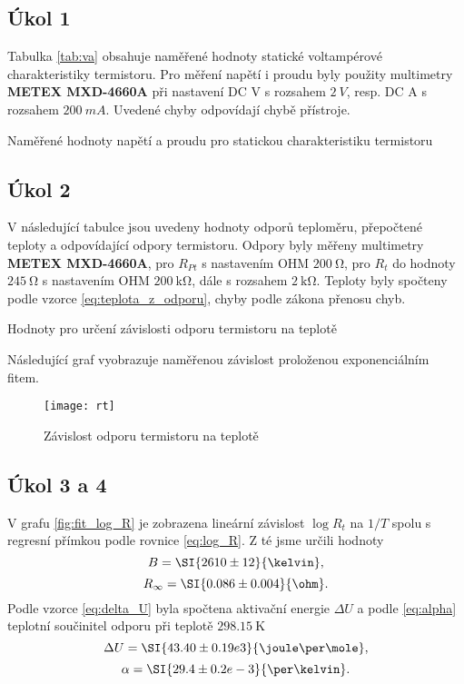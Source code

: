\documentclass[0-protokol.tex]{subfiles}
\begin{document}
\subsection*{Úkol 1}

Tabulka \ref{tab:va} obsahuje naměřené hodnoty statické voltampérové charakteristiky termistoru. Pro měření napětí i proudu byly použity multimetry \textbf{METEX MXD-4660A} při nastavení DC V s rozsahem $\SI{2}{V}$, resp. DC A s rozsahem $\SI{200}{mA}$. Uvedené chyby odpovídají chybě přístroje.%
\begin{table}[H] 
\centering
\setlength{\tabcolsep}{7pt}

\caption{Naměřené hodnoty napětí a proudu pro statickou charakteristiku termistoru}
\label{tab:va}
\end{table}

\subsection*{Úkol 2}
V následující tabulce jsou uvedeny hodnoty odporů teploměru, přepočtené teploty a odpovídající odpory termistoru. Odpory byly měřeny multimetry \textbf{METEX MXD-4660A}, pro $R_{Pt}$ s nastavením OHM $\SI{200}{\ohm}$, pro $R_t$ do hodnoty $\SI{245}{\ohm}$ s nastavením OHM $\SI{200}{\kilo\ohm}$, dále s rozsahem $\SI{2}{\kilo\ohm}$. Teploty byly spočteny podle vzorce \eqref{eq:teplota_z_odporu}, chyby podle zákona přenosu chyb.
\begin{table}[H] 
\centering
\setlength{\tabcolsep}{8pt}
\footnotesize

\normalsize
\caption{Hodnoty pro určení závislosti odporu termistoru na teplotě}
\label{tab:rt}
\end{table}

Následující graf vyobrazuje naměřenou závislost proloženou exponenciálním fitem.
\begin{figure}[H]
\centering
\texttt{[image: rt]}
\caption{Závislost odporu termistoru na teplotě}
\label{fig:rt}
\end{figure}

\subsection*{Úkol 3 a 4}

V grafu \ref{fig:fit_log_R} je zobrazena lineární závislost $\log R_t$ na $1/T$ spolu s regresní přímkou podle rovnice \eqref{eq:log_R}. Z té jsme určili hodnoty
$$ B = \SI{2610 \pm 12}{\kelvin}, $$
$$ R_\infty = \SI{0.086 \pm 0.004}{\ohm}. $$
Podle vzorce \eqref{eq:delta_U} byla spočtena aktivační energie $\Delta U$ a podle \eqref{eq:alpha} teplotní součinitel odporu při teplotě $\SI{298.15}{\kelvin}$
$$ \Delta U = \SI{43.40 \pm 0.19 e3}{\joule\per\mole}, $$
$$ \alpha = \SI{29.4 \pm 0.2 e-3}{\per\kelvin}. $$
\end{document}
